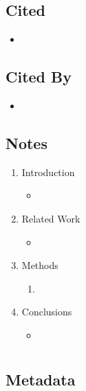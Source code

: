 \documentclass{article}
\begin{document}
\subsection*{Cited}
\begin{itemize}
	\item
\end{itemize}

\subsection*{Cited By}
\begin{itemize}
	\item
\end{itemize}

\subsection*{Notes}

\begin{enumerate}
	\item Introduction
	\begin{itemize}
		\item 
	\end{itemize}
	\item Related Work
	\begin{itemize}
		\item 
	\end{itemize}
	\item Methods
	\begin{enumerate}
		\item 
	\end{enumerate}
	\item Conclusions
	\begin{itemize}
		\item 
	\end{itemize}
\end{enumerate}

\pagebreak


\section*{}

\subsection*{Metadata}
\end{document}
